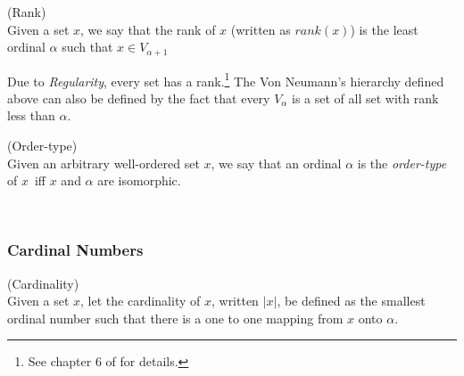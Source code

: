 \begin{definition}{(Rank)}\label{def:rank}\\ %
Given a set $x$, we say that the rank of $x$ (written as $rank(x)$) is the least ordinal $\alpha$ such that $x \in V_{\alpha+1}$
\end{definition}
Due to \emph{Regularity}, every set has a rank.\footnote{See chapter 6 of \cite{JechBook} for details.} 
The Von Neumann's hierarchy defined above can also be defined by the fact that every $V_\alpha$ is a set of all set with rank less than $\alpha$.

\begin{definition}{(Order-type)}\label{def:order_type}\\ %
Given an arbitrary well-ordered set $x$, we say that an ordinal $\alpha$ is the \emph{order-type} of $x$ iff $x$ and $\alpha$ are isomorphic. %
\end{definition}


\

\subsubsection{Cardinal Numbers}

\begin{definition}{(Cardinality)}\\
Given a set $x$, let the cardinality of $x$, written $|x|$, be defined as the smallest ordinal number such that there is a one to one mapping from $x$ onto $\alpha$.
\end{definition}

